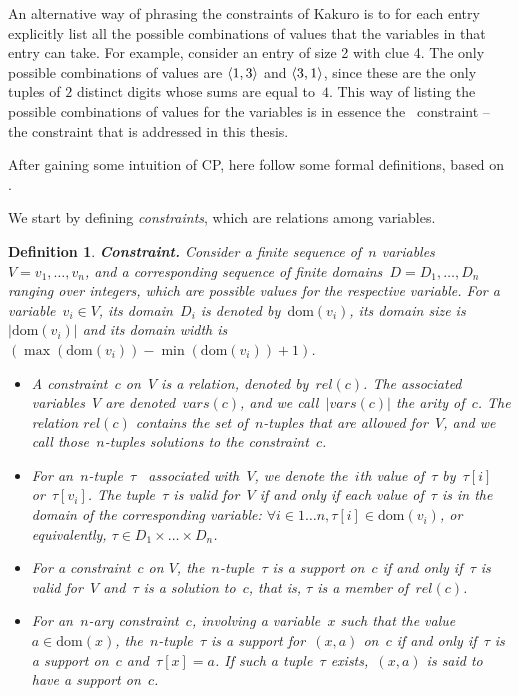 \documentclass[a4paper,11pt]{article}
\newtheorem{definition}{Definition}
\newcommand{\Table}{\Constraint{Table}}
\newcommand{\Dom}[1]{\text{dom}({#1})}
\numberwithin{equation}{section}
\begin{document}
An alternative way of phrasing the constraints of Kakuro is to for each entry
explicitly list all the possible combinations
of values that the variables in that entry can take.
For example, consider an entry of size 2 with clue 4. The only
possible combinations of values are $\left\langle1,3\right\rangle$ and $\left\langle3,1\right\rangle$, since
these are the only tuples of $2$ distinct digits whose sums are 
equal to~$4$. This way of listing the possible combinations of 
values for the variables is in essence the 
\Table~constraint -- the constraint that is
addressed in this thesis.

\smallskip 

After gaining some intuition of CP, here follow some formal definitions, based on
\cite{Apt:constraintsBook,SchulteCarlsson:FDsys,Gecode:MPG}.%

We start by defining \emph{constraints}, which are relations
among variables.

\begin{definition}
  \label{def:constraint}
  \textbf{Constraint.} Consider a finite sequence of~$n$ 
  variables~$V = v_1,\ldots,v_n$, and a corresponding sequence of
  finite \emph{domains}~$D = D_1,\ldots,D_n$ ranging over integers,
  which are possible values for the
  respective variable. 
  For a variable~$v_i \in V$, its domain~$D_i$ is denoted 
  by~$\Dom{v_i}$, its \emph{domain size} is~$|\Dom{v_i}|$ and its \emph{domain width}
  is $(\max(\Dom{v_i}) - \min(\Dom{v_i}) + 1)$.
  \begin{itemize}
    \item   A \emph{constraint}~$c$ on~$V$ is a relation, 
      denoted by~$rel(c)$. The associated variables~$V$ are denoted~$\mathit{vars}(c)$,
      and we call~$|\mathit{vars}(c)|$ the \emph{arity} of~$c$. The relation
      $rel(c)$ contains the set of~$n$-tuples that are allowed
      for~$V$, and we call those~$n$-tuples \emph{solutions} to the constraint~$c$.
    \item   For an~$n$-tuple~$\tau$~%
      associated with~$V$, we
      denote the~$i$th value of~$\tau$ by~$\tau[i]$ or~$\tau[v_i]$. The 
      tuple~$\tau$ is \emph{valid} for~$V$
      if and only if each value of~$\tau$ is in the domain of the corresponding
      variable: $\forall i \in 1 \ldots n, \tau[i] \in \Dom{v_i}$, or equivalently,
      $\tau \in D_1 \times \dots \times D_n$.
    \item For a constraint~$c$ on $V$, the~$n$-tuple~$\tau$ is 
      a \emph{support} on~$c$ if and only
      if~$\tau$ is valid for~$V$ and~$\tau$ is a solution to~$c$, that is,
      $\tau$ is a member of~$rel(c)$.
    \item For an~$n$-ary constraint~$c$, involving a variable~$x$ such that
      the value~$a \in \Dom{x}$, the~$n$-tuple~$\tau$ is a 
      \emph{support for}~$(x,a)$ on~$c$ if and only if~$\tau$ is a support on~$c$
      and~$\tau[x] = a$.
      If such a tuple~$\tau$ exists,~$(x,a)$ is said to have a support on~$c$.
    \end{itemize}
\end{definition}
\end{document}
